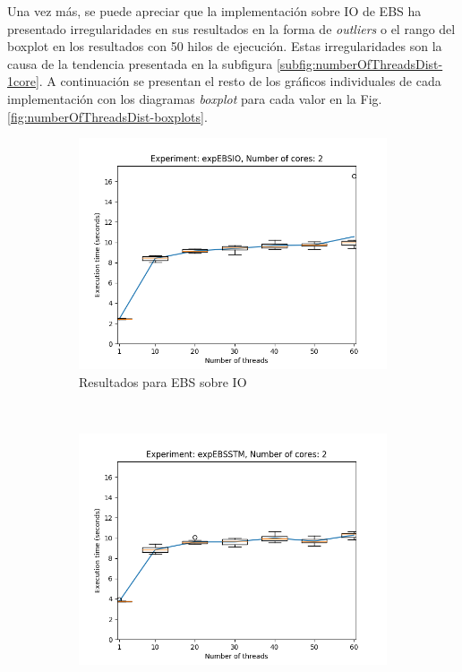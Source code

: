 Una vez más, se puede apreciar que la implementación sobre IO de EBS ha presentado irregularidades en sus resultados en la forma de \emph{outliers} o el rango del boxplot en los resultados con 50 hilos de ejecución.
Estas irregularidades son la causa de la tendencia presentada en la subfigura \ref{subfig:numberOfThreadsDist-1core}.
A continuación se presentan el resto de los gráficos individuales de cada implementación con los diagramas \emph{boxplot} para cada valor en la Fig. \ref{fig:numberOfThreadsDist-boxplots}.

\clearpage
\begin{figure}[H]
       \centering
    \begin{subfigure}[b]{0.49\textwidth}
        \includegraphics[width=\textwidth]{images/numberOfThreadsDist/plots/expEBSIO-2}
        \caption{Resultados para EBS sobre IO}
        \label{subfig:numberOfThreadsDist-ebsio-2}
    \end{subfigure}
    ~
    \begin{subfigure}[b]{0.49\textwidth}
        \includegraphics[width=\textwidth]{images/numberOfThreadsDist/plots/expEBSSTM-2}

\end{subfigure}
\end{figure}
